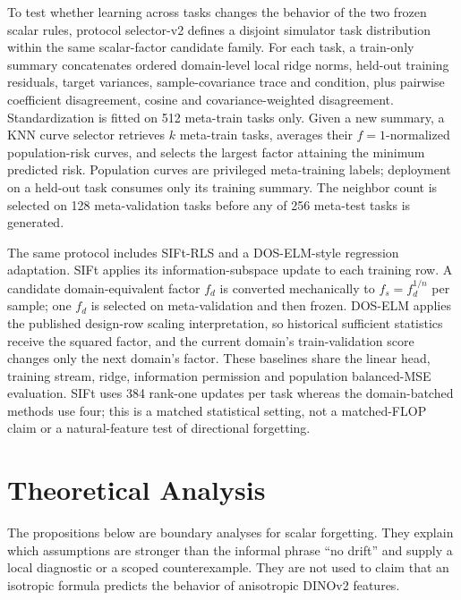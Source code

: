 \documentclass[10pt]{article}
\begin{document}
To test whether learning across tasks changes the behavior of the two frozen
scalar rules, protocol selector-v2 defines a disjoint simulator task
distribution within the same scalar-factor candidate family.
For each task, a train-only summary concatenates ordered domain-level local
ridge norms, held-out training residuals, target variances, sample-covariance
trace and condition, plus pairwise coefficient disagreement, cosine and
covariance-weighted disagreement. Standardization is fitted on 512 meta-train
tasks only. Given a new summary, a KNN curve selector retrieves $k$ meta-train
tasks, averages their $f=1$-normalized population-risk curves, and selects the
largest factor attaining the minimum predicted risk. Population curves are
privileged meta-training labels; deployment on a held-out task consumes only
its training summary. The neighbor count is selected on 128 meta-validation
tasks before any of 256 meta-test tasks is generated.

The same protocol includes SIFt-RLS and a DOS-ELM-style regression adaptation.
SIFt applies its information-subspace update to each training row. A candidate
domain-equivalent factor $f_d$ is converted mechanically to
$f_s=f_d^{1/n}$ per sample; one $f_d$ is selected on meta-validation and then
frozen. DOS-ELM applies the published design-row scaling interpretation, so
historical sufficient statistics receive the squared factor, and the current
domain's train-validation score changes only the next domain's factor. These
baselines share the linear head, training stream, ridge, information
permission and population balanced-MSE evaluation. SIFt uses 384 rank-one
updates per task whereas the domain-batched methods use four; this is a
matched statistical setting, not a matched-FLOP claim or a natural-feature
test of directional forgetting.

\section{Theoretical Analysis}
\label{sec:theory}

The propositions below are boundary analyses for scalar forgetting. They
explain which assumptions are stronger than the informal phrase ``no drift''
and supply a local diagnostic or a scoped counterexample. They are not used to
claim that an isotropic formula predicts the behavior of anisotropic DINOv2
features.
\end{document}
